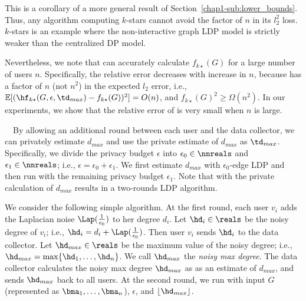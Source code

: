 This is a corollary of a more general result of Section~\ref{chap1-sub:lower_bounds}. Thus,
any algorithm computing $k$-stars cannot avoid the factor of $n$ in its $l_2^2$
loss. $k$-stars 
is an example where the non-interactive graph LDP model is strictly weaker than
the centralized DP model.

Nevertheless, we note that  can accurately calculate $f_{k\star}(G)$ for a large number of users $n$. 
Specifically, the relative error decreases with increase in $n$, because  has a factor of $n$ (not $n^2$) in the expected $l_2$ error, i.e., $\mathbb{E}[(\hf_{k\star}(G, \epsilon, \td_{max}) - f_{k\star}(G))^2] = O(n)$, 
and $f_{k\star}(G)^2 \geq \Omega(n^2)$. 
In our experiments, we show that the relative error of  is very small when $n$ is large.

\smallskip
{}~~By allowing an additional round between each user and the data collector, we can privately estimate $d_{max}$ and use the private estimate of $d_{max}$ as $\td_{max}$. 
Specifically, 
we divide the privacy budget $\epsilon$ into 
$\epsilon_0 \in \nnreals$ and $\epsilon_1 \in \nnreals$; i.e., $\epsilon = \epsilon_0 + \epsilon_1$. 
We first estimate $d_{max}$ with $\epsilon_0$-edge LDP and then run  with the remaining privacy budget $\epsilon_1$. 
Note that  with the private calculation of $d_{max}$ results in a two-rounds LDP algorithm.

We consider the following simple algorithm. 
At the first round, 
each user $v_i$ adds the Laplacian noise $\Lap(\frac{1}{\epsilon_0})$ to her degree $d_i$. 
Let $\hd_i \in \reals$ be the noisy degree of $v_i$; i.e., $\hd_i = d_i + \Lap(\frac{1}{\epsilon_0})$. 
Then user $v_i$ sends $\hd_i$ to the data collector. 
Let $\hd_{max} \in \reals$ be the maximum value of the noisy degree; i.e., $\hd_{max} = \max\{\hd_1, \ldots, \hd_n\}$. 
We call $\hd_{max}$ the \textit{noisy max degree}. 
The data collector calculates the noisy max degree $\hd_{max}$ as 
as an estimate of $d_{max}$, 
and sends $\hd_{max}$ back to all users. 
At the second round, we run  
with input $G$ (represented as $\bma_1, \ldots, \bma_n$), $\epsilon$, and $\lfloor \hd_{max} \rfloor$.

